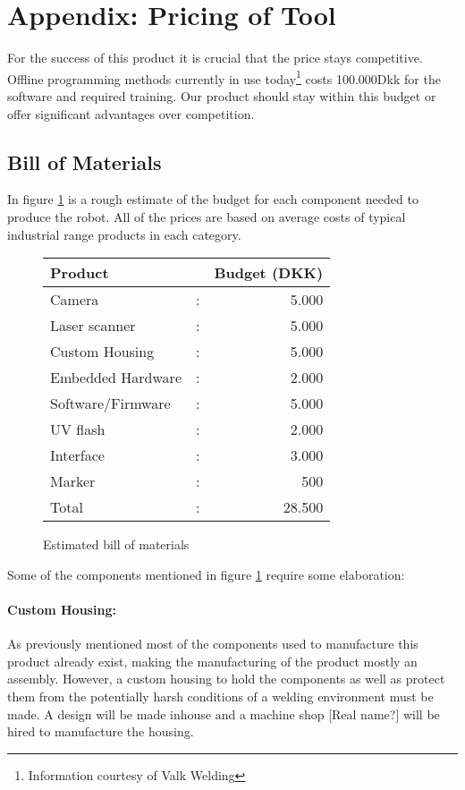 \section{Appendix: Pricing of Tool}
For the success of this product it is crucial that the price stays competitive. Offline programming methods currently in use today\footnote{Information courtesy of Valk Welding} costs 100.000Dkk for the software and required training. Our product should stay within this budget or offer significant advantages over competition.
\subsection{Bill of Materials}
In figure \ref{tab:BoM} is a rough estimate of the budget for each component needed to produce the robot. All of the prices are based on average costs of typical industrial range products in each category.  

\begin{figure}[h]
	\begin{center}
		\begin{tabular}{l c r}
		Product            & & Budget (DKK)\\
		\hline
		Camera 				& : & 5.000  \\
		Laser scanner		& : & 5.000 \\
		Custom Housing		& : & 5.000\\
		Embedded Hardware	& : & 2.000\\
		Software/Firmware	& : & 5.000\\
		UV flash			& : & 2.000\\
		Interface			& : & 3.000\\
		Marker				& : & 500\\[0.2cm]
		\hline
		Total				& : & 28.500\\ 
		\end{tabular}
	\end{center}
	\caption{Estimated bill of materials}
\label{tab:BoM}
\end{figure}
Some of the components mentioned in figure \ref{tab:BoM} require some elaboration:
\paragraph{Custom Housing:}
As previously mentioned most of the components used to manufacture this product already exist, making the manufacturing of the product mostly an assembly. However, a custom housing to hold the components as well as protect them from the potentially harsh conditions of a welding environment must be made. A design will be made inhouse and a machine shop [Real name?] will be hired to manufacture the housing.
